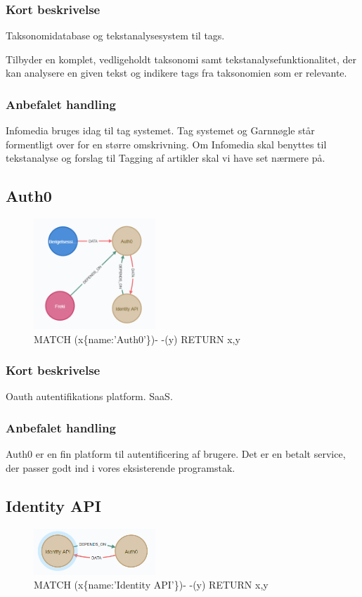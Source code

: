 \documentclass{article}
\begin{document}
\subsubsection{Kort beskrivelse}
Taksonomidatabase og tekstanalysesystem til tags.

Tilbyder en komplet, vedligeholdt taksonomi samt tekstanalysefunktionalitet, der kan analysere en given tekst og indikere tags fra taksonomien som er relevante.

\subsubsection{Anbefalet handling}
Infomedia bruges idag til tag systemet. Tag systemet og Garnnøgle står formentligt over for en større omskrivning. Om Infomedia skal benyttes til tekstanalyse og forslag til Tagging af artikler skal vi have set nærmere på.



\subsection{Auth0}
\begin{figure}[h]
\includegraphics[width=130pt]{Auth0.PNG}
\caption{MATCH (x\{name:'Auth0'\})- -(y) RETURN x,y}
\end{figure}
\subsubsection{Kort beskrivelse}
Oauth autentifikations platform. SaaS.
\subsubsection{Anbefalet handling}
Auth0 er en fin platform til autentificering af brugere. Det er en betalt service, der passer godt ind i vores eksisterende programstak. 



\subsection{Identity API}
\begin{figure}[h]
\includegraphics[width=130pt]{Identity.PNG}
\caption{MATCH (x\{name:'Identity API'\})- -(y) RETURN x,y}
\end{figure}
\end{document}
